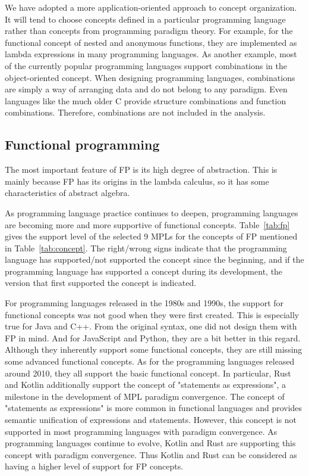 We have adopted a more application-oriented approach to concept organization.
It will tend to choose concepts defined in a particular programming
language rather than concepts from programming paradigm theory.
For example, for the functional concept of nested and anonymous functions,
they are implemented as lambda expressions in many programming languages.
As another example, most of the currently popular programming languages
support combinations in the object-oriented concept.
When designing programming languages, combinations are simply a way of
arranging data and do not belong to any paradigm.
Even languages like the much older C provide structure combinations and
function combinations.
Therefore, combinations are not included in the analysis.

\subsection{Functional programming}

The most important feature of FP is its high degree of abstraction.
This is mainly because FP has its origins in the lambda calculus,
so it has some characteristics of abstract algebra.


As programming language practice continues to deepen,
programming languages are becoming more and more supportive
of functional concepts.
Table~\ref{tab:fp} gives the support level of the selected 9 MPLs for the concepts
of FP mentioned in Table~\ref{tab:concept}.
The right/wrong signs indicate that the programming language has
supported/not supported the concept since the beginning,
and if the programming language has supported a concept during its development,
the version that first supported the concept is indicated.


For programming languages released in the 1980s and 1990s,
the support for functional concepts was not good when they
were first created.
This is especially true for Java and C++.
From the original syntax, one did not design them with FP in mind.
And for JavaScript and Python, they are a bit better in this regard.
Although they inherently support some functional concepts,
they are still missing some advanced functional concepts.
As for the programming languages released around 2010,
they all support the basic functional concept.
In particular, Rust and Kotlin additionally support the concept
of "statements as expressions", a milestone in the development
of MPL paradigm convergence.
The concept of "statements as expressions"
is more common in functional languages and provides semantic
unification of expressions and statements.
However, this concept is not supported in most programming languages with paradigm convergence.
As programming languages continue to evolve, Kotlin and Rust
are supporting this concept with paradigm convergence.
Thus Kotlin and Rust can be considered as having a higher
level of support for FP concepts.

